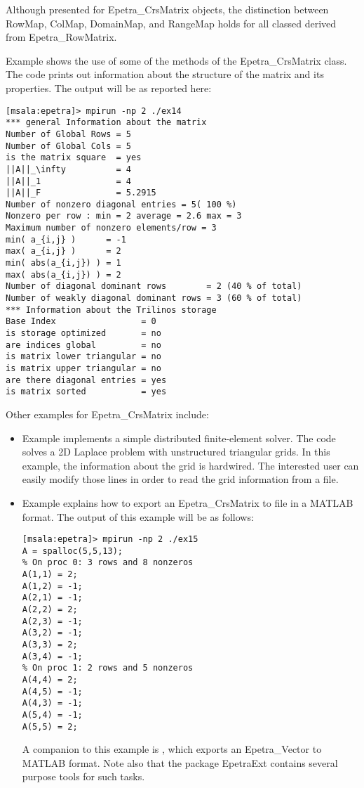 \begin{remark}
Although presented for Epetra\_CrsMatrix objects, the distinction
between RowMap, ColMap, DomainMap, and RangeMap holds for all classed
derived from Epetra\_RowMatrix. 
\end{remark}


\medskip

Example  shows the use of some of the methods of
the Epetra\_CrsMatrix class. The code prints out information about the
structure of the matrix and its properties.  The output will be as
reported here:
\begin{verbatim}
[msala:epetra]> mpirun -np 2 ./ex14
*** general Information about the matrix
Number of Global Rows = 5
Number of Global Cols = 5
is the matrix square  = yes
||A||_\infty          = 4
||A||_1               = 4
||A||_F               = 5.2915
Number of nonzero diagonal entries = 5( 100 %)
Nonzero per row : min = 2 average = 2.6 max = 3
Maximum number of nonzero elements/row = 3
min( a_{i,j} )      = -1
max( a_{i,j} )      = 2
min( abs(a_{i,j}) ) = 1
max( abs(a_{i,j}) ) = 2
Number of diagonal dominant rows        = 2 (40 % of total)
Number of weakly diagonal dominant rows = 3 (60 % of total)
*** Information about the Trilinos storage
Base Index                 = 0
is storage optimized       = no
are indices global         = no
is matrix lower triangular = no
is matrix upper triangular = no
are there diagonal entries = yes
is matrix sorted           = yes
\end{verbatim}

Other examples for Epetra\_CrsMatrix include:
\begin{itemize}
\item Example  implements a simple distributed
  finite-element solver.  The code solves a 2D Laplace problem with
  unstructured triangular grids. In this example, the information about
  the grid is hardwired.  The interested user can easily modify those
  lines in order to read the grid information from a file.
\item Example  explains how to export an
  Epetra\_CrsMatrix to file in a MATLAB format.  The output of this
  example will be as follows:
\begin{verbatim}
[msala:epetra]> mpirun -np 2 ./ex15
A = spalloc(5,5,13);
% On proc 0: 3 rows and 8 nonzeros
A(1,1) = 2;
A(1,2) = -1;
A(2,1) = -1;
A(2,2) = 2;
A(2,3) = -1;
A(3,2) = -1;
A(3,3) = 2;
A(3,4) = -1;
% On proc 1: 2 rows and 5 nonzeros
A(4,4) = 2;
A(4,5) = -1;
A(4,3) = -1;
A(5,4) = -1;
A(5,5) = 2;
\end{verbatim}
  A companion to this example is \newline {},
  which exports an Epetra\_Vector to MATLAB format. Note also that the
  package EpetraExt contains several purpose tools for such tasks.
\end{itemize}

